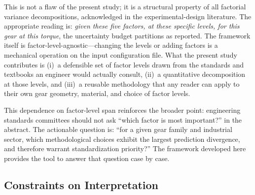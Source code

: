 \documentclass[twocolumn,12pt,a4paper]{article}
\begin{document}
This is not a flaw of the present study; it is a structural property of
all factorial variance decompositions, acknowledged in the
experimental-design literature. The appropriate reading is: \emph{given
these five factors, at these specific levels, for this gear at this
torque}, the uncertainty budget partitions as reported. The framework
itself is factor-level-agnostic---changing the levels or adding factors
is a mechanical operation on the input configuration file. What the
present study contributes is (i)~a defensible set of factor levels
drawn from the standards and textbooks an engineer would actually
consult, (ii)~a quantitative decomposition at those levels, and
(iii)~a reusable methodology that any reader can apply to their own
gear geometry, material, and choice of factor levels.

This dependence on factor-level span reinforces the broader point:
engineering standards committees should not ask ``which factor is most
important?'' in the abstract. The actionable question is: ``for a given
gear family and industrial sector, which methodological choices exhibit
the largest prediction divergence, and therefore warrant
standardization priority?'' The framework developed here provides the
tool to answer that question case by case.

\subsection{Constraints on Interpretation}
\label{sec:constraints}
\end{document}
